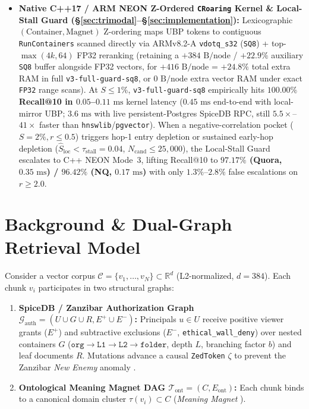 \documentclass[conference]{IEEEtran}
\begin{document}
\begin{itemize}
    \item \textbf{Native C++17 / ARM NEON Z-Ordered \texttt{CRoaring} Kernel \& Local-Stall Guard (\S\ref{sec:trimodal}--\S\ref{sec:implementation}):} Lexicographic $(\text{Container}, \text{Magnet})$ Z-ordering maps UBP tokens to contiguous \texttt{RunContainers} scanned directly via ARMv8.2-A \texttt{vdotq\_s32} (\texttt{SQ8}) + top-$\max(4k,64)$ FP32 reranking (retaining a $+384\text{ B/node}$ / $+22.9\%$ auxiliary \texttt{SQ8} buffer alongside FP32 vectors, for $+416\text{ B/node}$ = $+24.8\%$ total extra RAM in full \texttt{v3-full-guard-sq8}, or $0\text{ B/node}$ extra vector RAM under exact \texttt{FP32} range scans). At $S \le 1\%$, \texttt{v3-full-guard-sq8} empirically hits \textbf{$100.00\%$ Recall@10 in $0.05$--$0.11\text{ ms}$} kernel latency ($0.45\text{ ms}$ end-to-end with local-mirror UBP; $3.6\text{ ms}$ with live persistent-Postgres SpiceDB RPC, still $5.5\times$--$41\times$ faster than \texttt{hnswlib}/\texttt{pgvector}). When a negative-correlation pocket ($S=2\%, r \le 0.5$) triggers hop-1 entry depletion or sustained early-hop depletion ($\hat{S}_{\text{loc}} < \tau_{\text{stall}}=0.04$, $N_{\text{cand}} \le 25{,}000$), the Local-Stall Guard escalates to C++ NEON Mode~3, lifting Recall@10 to \textbf{$97.17\%$ (Quora, $0.35\text{ ms}$) / $96.42\%$ (NQ, $0.17\text{ ms}$)} with only $1.3\%$--$2.8\%$ false escalations on $r \ge 2.0$.
\end{itemize}

\section{Background \& Dual-Graph Retrieval Model}
\label{sec:background}

Consider a vector corpus $\mathcal{C} = \{v_1, \dots, v_N\} \subset \mathbb{R}^d$ (L2-normalized, $d=384$). Each chunk $v_i$ participates in two structural graphs:
\begin{enumerate}
    \item \textbf{SpiceDB / Zanzibar Authorization Graph $\mathcal{G}_{\text{auth}} = (U \cup G \cup R, E^+ \cup E^-)$:} Principals $u \in U$ receive positive viewer grants ($E^+$) and subtractive exclusions ($E^-$, \texttt{ethical\_wall\_deny}) over nested containers $G$ ($\texttt{org} \to \texttt{L1} \to \texttt{L2} \to \texttt{folder}$, depth $L$, branching factor $b$) and leaf documents $R$. Mutations advance a causal \texttt{ZedToken} $\zeta$ to prevent the Zanzibar \textit{New Enemy} anomaly \cite{pang2019zanzibar}.
    \item \textbf{Ontological Meaning Magnet DAG $\mathcal{T}_{\text{ont}} = (C, E_{\text{ont}})$:} Each chunk binds to a canonical domain cluster $\tau(v_i) \subset C$ (\textit{Meaning Magnet} \cite{potineni2026engramrag}).
\end{enumerate}
\end{document}
